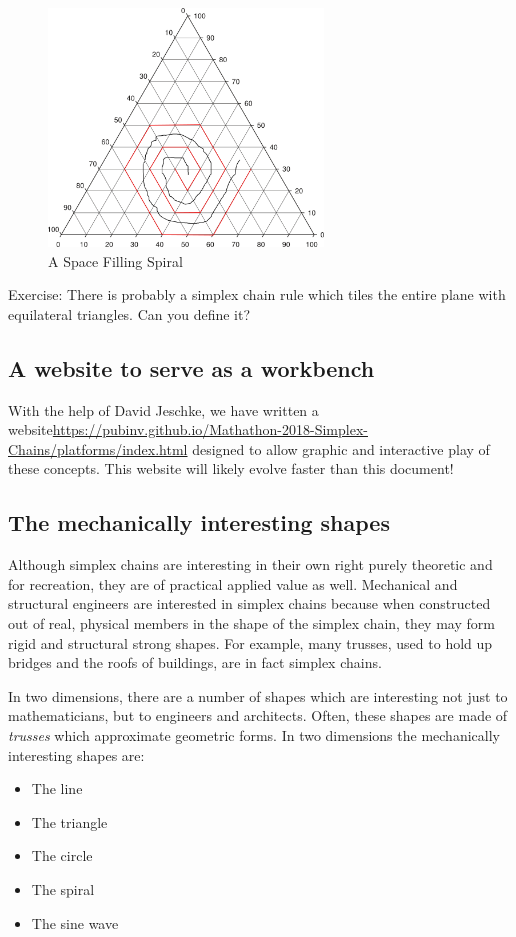 \documentclass[11pt]{article}
\begin{document}
\begin{figure}
     \centering
     \includegraphics[width=0.65\textwidth]{figures/2DSpaceFilling.png}
     \caption{A Space Filling Spiral}
  \label{fig:equitetrabeam}
\end{figure}


Exercise: There is probably a simplex chain rule which tiles the entire plane with equilateral triangles. Can you define it?

\subsection{A website to serve as a workbench}

With the help of David Jeschke, we have written a website\url{https://pubinv.github.io/Mathathon-2018-Simplex-Chains/platforms/index.html}
designed to allow graphic and interactive play of these concepts.  This website will likely evolve faster than this document!

\subsection{The mechanically interesting shapes}

Although simplex chains are interesting in their own right purely theoretic and for recreation,
they are of practical applied value as well.
Mechanical and structural engineers are interested in simplex chains because when constructed out of real, physical
members in the shape of the simplex chain, they may form rigid and structural strong shapes.
For example, many trusses, used to hold up bridges and the roofs of buildings, are in fact simplex chains.

In two dimensions, there are a number of shapes which are interesting not just to mathematicians, but
to engineers and architects. Often, these shapes are made of {\em trusses} which approximate
geometric forms.
In two dimensions the mechanically interesting shapes are:
\begin{itemize}
\item The line
\item The triangle
\item The circle
\item The spiral
\item The sine wave
\end{itemize}
\end{document}
